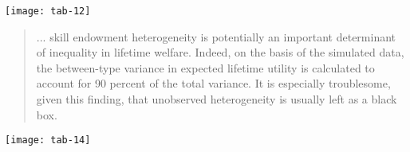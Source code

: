 \begin{frame}[plain]
\begin{center}
\texttt{[image: tab-12]}
\end{center}
\end{frame}
\begin{frame}\begin{quote}
... skill endowment heterogeneity is potentially an important determinant of inequality in lifetime welfare. Indeed, on the basis of the simulated data, the between-type variance in expected lifetime utility is calculated to account for 90 percent of the total variance. It is especially troublesome, given this finding, that unobserved heterogeneity is usually left as a black box.
\end{quote}\end{frame}
\begin{frame}[plain]
\begin{center}
\texttt{[image: tab-14]}
\end{center}
\end{frame}

